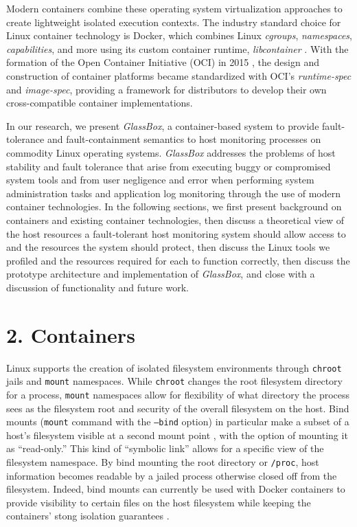 \documentclass{proc}
\begin{document}
Modern containers combine these operating system virtualization approaches to create lightweight isolated execution contexts. The industry standard choice for Linux container technology is Docker, which combines Linux \textit{cgroups}, \textit{namespaces}, \textit{capabilities}, and more using its custom container runtime, \textit{libcontainer} \cite{hykes2014libcontainer}. With the formation of the Open Container Initiative (OCI) in 2015 \cite{opencontainerinitiative}, the design and construction of container platforms became standardized with OCI's \textit{runtime-spec} and \textit{image-spec}, providing a framework for distributors to develop their own cross-compatible container implementations.

In our research, we present \textit{GlassBox}, a container-based system to provide fault-tolerance and fault-containment semantics to host monitoring processes on commodity Linux operating systems. \textit{GlassBox} addresses the problems of host stability and fault tolerance that arise from executing buggy or compromised system tools and from user negligence and error when performing system administration tasks and application log monitoring through the use of modern container technologies. In the following sections, we first present background on containers and existing container technologies, then discuss a theoretical view of the host resources a fault-tolerant host monitoring system should allow access to and the resources the system should protect, then discuss the Linux tools we profiled and the resources required for each to function correctly, then discuss the prototype architecture and implementation of \textit{GlassBox}, and close with a discussion of functionality and future work.

\section*{2. Containers}

Linux supports the creation of isolated filesystem environments through \texttt{chroot} jails and \texttt{mount} namespaces. While \texttt{chroot} changes the root filesystem directory for a process, \texttt{mount} namespaces allow for flexibility of what directory the process sees as the filesystem root and security of the overall filesystem on the host. Bind mounts (\texttt{mount} command with the \texttt{--bind} option) in particular make a subset of a host's filesystem visible at a second mount point \cite{bindmount}, with the option of mounting it as ``read-only.'' This kind of ``symbolic link'' allows for a specific view of the filesystem namespace. By bind mounting the root directory or \texttt{/proc}, host information becomes readable by a jailed process otherwise closed off from the filesystem. Indeed, bind mounts can currently be used with Docker containers to provide visibility to certain files on the host filesystem while keeping the containers' stong isolation guarantees \cite{dockerdoc}.
\end{document}

